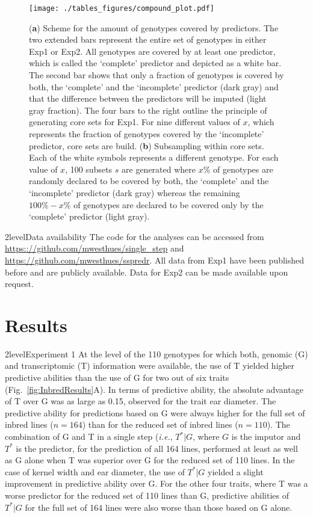 \documentclass[12pt,titlepage]{article}
\begin{document}
\begin{figure}[H]
  \centering
  \texttt{[image: ./tables\_figures/compound\_plot.pdf]}
  \caption{
  (\textbf{a}) Scheme for the amount of genotypes covered by predictors.
  The two extended bars represent the entire set of genotypes in either
  Exp1 or Exp2.
  All genotypes are covered by at least one predictor, which is called the
  `complete' predictor and depicted as a white bar.
  The second bar shows that only a fraction of genotypes is covered by both,
  the `complete' and the `incomplete' predictor (dark gray) and that the
  difference between the predictors will be imputed (light gray fraction).
  The four bars to the right outline the principle of generating core sets for
  Exp1.
  For nine different values of $x$, which represents the fraction of genotypes
  covered by the `incomplete' predictor, core sets are build.
  (\textbf{b}) Subsampling within core sets.
  Each of the white symbols represents a different genotype.
  For each value of $x$, 100 subsets $s$ are generated where $x\%$ of genotypes
  are randomly declared to be covered by both, the `complete' and the
  `incomplete' predictor (dark gray) whereas the remaining $100\% - x\%$ of
  genotypes are declared to be covered only by the `complete' predictor (light
  gray).
  }
\label{fig:compound-plot}
\end{figure}

\Genetics2level{Data availability}
The code for the analyses can be accessed from 
\url{https:://github.com/mwesthues/single\_step} and
\url{https://github.com/mwesthues/sspredr}.
All data from Exp1 have been published before and are publicly available.
Data for Exp2 can be made available upon request.




\section*{Results}
\Genetics2level{Experiment 1}
At the level of the 110 genotypes for which both, genomic (G) and 
transcriptomic (T) information were available, the use of T yielded higher
predictive abilities than the use of G for two out of six traits
(Fig.~\ref{fig:InbredResults}A).
In terms of predictive ability, the absolute advantage of T over G was as large 
as 0.15, observed for the trait ear diameter\@.
The predictive ability for predictions based on G were always higher for the
full set of inbred lines ($n = 164$) than for the reduced set of inbred lines
($n = 110$).
The combination of G and T in a single step (\textit{i.e.}, $T^{*}|G$, where
$G$ is the imputor and $T^{*}$ is the predictor, for the prediction of all 164
lines, performed at least as well as G alone when T was superior over G for the
reduced set of 110 lines.
In the case of kernel width and ear diameter, the use of $T^{*}|G$ yielded a slight 
improvement in predictive ability over G.
For the other four traits, where T was a worse predictor for the reduced set of
110 lines than G, predictive abilities of $T^{*}|G$ for the full set of 164
lines were also worse than those based on G alone.
\end{document}
